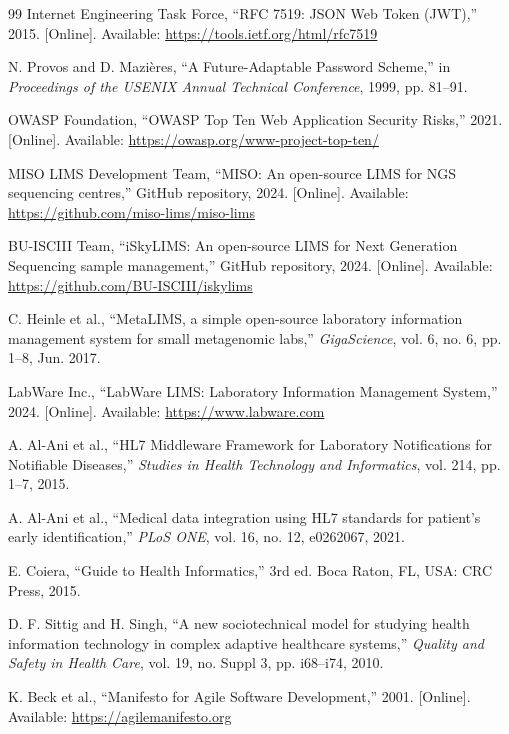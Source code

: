 \documentclass[12pt, a4paper]{report}
\begin{document}
\begin{thebibliography}{99}
Internet Engineering Task Force, ``RFC 7519: JSON Web Token (JWT),'' 2015. [Online]. Available: \url{https://tools.ietf.org/html/rfc7519}

N. Provos and D. Mazières, ``A Future-Adaptable Password Scheme,'' in \textit{Proceedings of the USENIX Annual Technical Conference}, 1999, pp. 81--91.

OWASP Foundation, ``OWASP Top Ten Web Application Security Risks,'' 2021. [Online]. Available: \url{https://owasp.org/www-project-top-ten/}

MISO LIMS Development Team, ``MISO: An open-source LIMS for NGS sequencing centres,'' GitHub repository, 2024. [Online]. Available: \url{https://github.com/miso-lims/miso-lims}

BU-ISCIII Team, ``iSkyLIMS: An open-source LIMS for Next Generation Sequencing sample management,'' GitHub repository, 2024. [Online]. Available: \url{https://github.com/BU-ISCIII/iskylims}

C. Heinle et al., ``MetaLIMS, a simple open-source laboratory information management system for small metagenomic labs,'' \textit{GigaScience}, vol. 6, no. 6, pp. 1--8, Jun. 2017.

LabWare Inc., ``LabWare LIMS: Laboratory Information Management System,'' 2024. [Online]. Available: \url{https://www.labware.com}

A. Al-Ani et al., ``HL7 Middleware Framework for Laboratory Notifications for Notifiable Diseases,'' \textit{Studies in Health Technology and Informatics}, vol. 214, pp. 1--7, 2015.

A. Al-Ani et al., ``Medical data integration using HL7 standards for patient's early identification,'' \textit{PLoS ONE}, vol. 16, no. 12, e0262067, 2021.

E. Coiera, ``Guide to Health Informatics,'' 3rd ed. Boca Raton, FL, USA: CRC Press, 2015.

D. F. Sittig and H. Singh, ``A new sociotechnical model for studying health information technology in complex adaptive healthcare systems,'' \textit{Quality and Safety in Health Care}, vol. 19, no. Suppl 3, pp. i68--i74, 2010.

K. Beck et al., ``Manifesto for Agile Software Development,'' 2001. [Online]. Available: \url{https://agilemanifesto.org}


\end{thebibliography}
\end{document}
